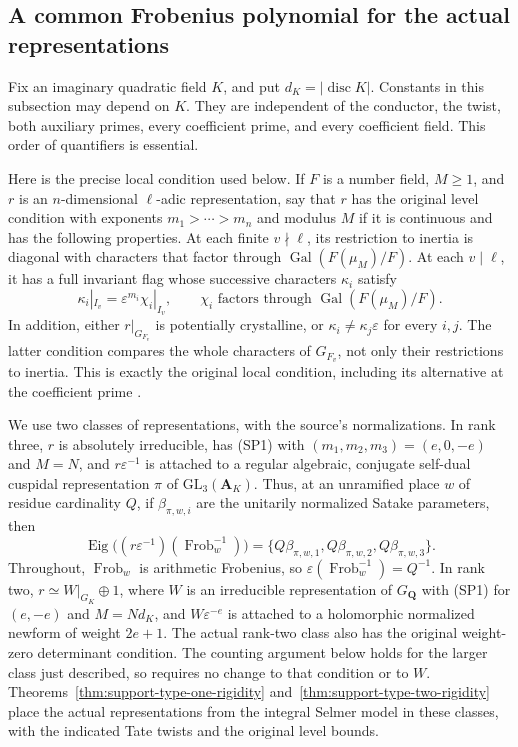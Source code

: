 \subsection{A common Frobenius polynomial for the actual representations}
\label{sec:support-spectrum}

Fix an imaginary quadratic field $K$, and put $d_K=|\operatorname{disc}K|$.
Constants in this subsection may depend on $K$.  They are independent of
the conductor, the twist, both auxiliary primes, every coefficient prime,
and every coefficient field.  This order of quantifiers is essential.

Here is the precise local condition used below.  If $F$ is a number field,
$M\ge1$, and $r$ is an $n$-dimensional $\ell$-adic representation, say
that $r$ has the original level condition with exponents
$m_1>\cdots>m_n$ and modulus $M$ if it is continuous and has the
following properties.  At each finite $v\nmid\ell$, its restriction
to inertia is diagonal with characters that factor through
$\operatorname{Gal}(F(\mu_M)/F)$.  At each $v\mid\ell$, it has a
full invariant flag whose successive characters $\kappa_i$ satisfy
\[
 \kappa_i|_{I_v}=\varepsilon^{m_i}\chi_i|_{I_v},\qquad
 \chi_i\text{ factors through }\operatorname{Gal}(F(\mu_M)/F).
                                                               \tag{SP1}
\]
In addition, either $r|_{G_{F_v}}$ is potentially crystalline, or
$\kappa_i\ne\kappa_j\varepsilon$ for every $i,j$.  The latter
condition compares the whole characters of $G_{F_v}$, not only
their restrictions to inertia.  This is exactly the original
local condition, including its alternative at the coefficient
prime \cite{support-spectrum-source}.

We use two classes of representations, with the source's normalizations.
In rank three, $r$ is absolutely irreducible, has (SP1) with
$(m_1,m_2,m_3)=(e,0,-e)$ and $M=N$, and
$r\varepsilon^{-1}$ is attached to a regular algebraic,
conjugate self-dual cuspidal representation $\pi$ of
$\mathrm{GL}_3(\mathbf A_K)$.  Thus, at an unramified place
$w$ of residue cardinality $Q$, if $\beta_{\pi,w,i}$ are the
unitarily normalized Satake parameters, then
\[
 \operatorname{Eig}\bigl((r\varepsilon^{-1})
                         (\operatorname{Frob}_w^{-1})\bigr)
       =\{Q\beta_{\pi,w,1},Q\beta_{\pi,w,2},Q\beta_{\pi,w,3}\}.
                                                               \tag{SP2}
\]
Throughout, $\operatorname{Frob}_w$ is arithmetic Frobenius,
so $\varepsilon(\operatorname{Frob}_w^{-1})=Q^{-1}$.
In rank two, $r\simeq W|_{G_K}\oplus1$, where $W$ is an
irreducible representation of $G_{\mathbf Q}$ with (SP1) for
$(e,-e)$ and $M=Nd_K$, and $W\varepsilon^{-e}$ is attached to
a holomorphic normalized newform of weight $2e+1$.  The actual
rank-two class also has the original weight-zero determinant
condition.  The counting argument below holds for the larger class
just described, so requires no change to that condition or to $W$.
Theorems~\ref{thm:support-type-one-rigidity}
and~\ref{thm:support-type-two-rigidity} place the actual
representations from the integral Selmer model in these classes,
with the indicated Tate twists and the original level bounds.

